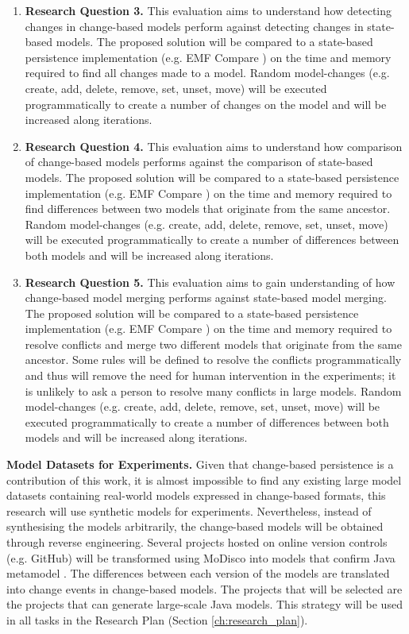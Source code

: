 \documentclass[12pt, a4paper]{report} \usepackage[titletoc]{appendix}
\begin{document}
\begin{enumerate}
    \item \textbf{Research Question 3.} This evaluation aims to understand how detecting changes in change-based models perform against detecting changes in state-based models. The proposed solution will be compared to a state-based persistence implementation (e.g. EMF Compare \cite{eclipse2017compare}) on the time and memory required to find all changes made to a model. Random model-changes (e.g. create, add, delete, remove, set, unset, move) will be executed programmatically to create a number of changes on the model and will be increased along iterations. 
    
    \item \textbf{Research Question 4.} This evaluation aims to understand how comparison of change-based models performs against the comparison of state-based models. The proposed solution will be compared to a state-based persistence implementation (e.g. EMF Compare \cite{eclipse2017compare}) on the time and memory required to find differences between two models that originate from the same ancestor. Random model-changes (e.g. create, add, delete, remove, set, unset, move) will be executed programmatically to create a number of differences between both models and will be increased along iterations.  
    
    \item \textbf{Research Question 5.} This evaluation aims to gain understanding of how change-based model merging performs against state-based model merging. The proposed solution will be compared to a state-based persistence implementation (e.g. EMF Compare \cite{eclipse2017compare}) on the time and memory required to resolve conflicts and merge two different models that originate from the same ancestor. Some rules will be defined to resolve the conflicts programmatically and thus will remove the need for human intervention in the experiments; it is unlikely to ask a person to resolve many conflicts in large models. Random model-changes (e.g. create, add, delete, remove, set, unset, move) will be executed programmatically to create a number of differences between both models and will be increased along iterations. 
\end{enumerate}

\textbf{Model Datasets for Experiments.} Given that change-based persistence is a contribution of this work, it is almost impossible to find any existing large model datasets containing real-world models expressed in change-based formats, this research will use synthetic models for experiments. Nevertheless, instead of synthesising the models arbitrarily, the change-based models will be obtained through reverse engineering. Several projects hosted on online version controls (e.g. GitHub) will be transformed using MoDisco \cite{DBLP:journals/infsof/BruneliereCDM14} into models that confirm Java metamodel \cite{eclipse2017modicso}. The differences between each version of the models are translated into change events in change-based models. The projects that will be selected are the projects that can generate large-scale Java models. This strategy will be used in all tasks in the Research Plan (Section \ref{ch:research_plan}).
\end{document}
